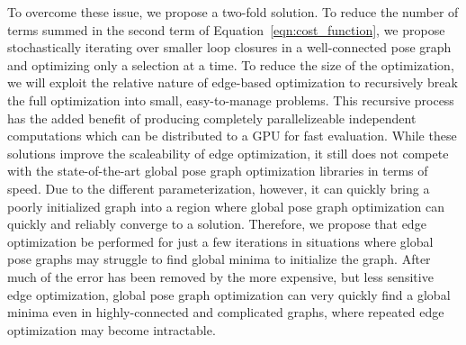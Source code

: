To overcome these issue, we propose a two-fold solution.  To reduce the number of terms summed in the second term of Equation~\ref{eqn:cost_function}, we propose stochastically iterating over smaller loop closures in a well-connected pose graph and optimizing only a selection at a time.  To reduce the size of the optimization, we will exploit the relative nature of edge-based optimization to recursively break the full optimization into small, easy-to-manage problems.  This recursive process has the added benefit of producing completely parallelizeable independent computations which can be distributed to a GPU for fast evaluation.  While these solutions improve the scaleability of edge optimization, it still does not compete with the state-of-the-art global pose graph optimization libraries in terms of speed.  Due to the different parameterization, however, it can quickly bring a poorly initialized graph into a region where global pose graph optimization can quickly and reliably converge to a solution.  Therefore, we propose that edge optimization be performed for just a few iterations in situations where global pose graphs may struggle to find global minima to initialize the graph.  After much of the error has been removed by the more expensive, but less sensitive edge optimization, global pose graph optimization can very quickly find a global minima even in highly-connected and complicated graphs, where repeated edge optimization may become intractable.
